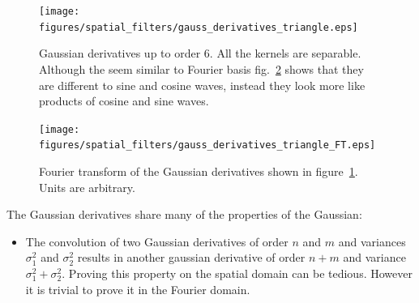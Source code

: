 \begin{figure}
\centerline{
\texttt{[image: figures/spatial\_filters/gauss\_derivatives\_triangle.eps]}}
\caption{Gaussian derivatives up to order 6. All the kernels are separable. Although the seem similar to Fourier basis fig.~\ref{fig:gauss_derivatives_triangle_FT} shows that they are different to sine and cosine waves, instead they look more like products of cosine and sine waves.} 
\label{fig:gauss_derivatives_triangle}
\end{figure}


\begin{figure}
\centerline{
\texttt{[image: figures/spatial\_filters/gauss\_derivatives\_triangle\_FT.eps]}}
\caption{Fourier transform of the Gaussian derivatives shown in figure~\ref{fig:gauss_derivatives_triangle}. Units are arbitrary.} 
\label{fig:gauss_derivatives_triangle_FT}
\end{figure}


The Gaussian derivatives share many of the properties of the Gaussian: 
\begin{itemize}
\item The convolution of two Gaussian derivatives of order $n$ and $m$ and variances $\sigma_1^2$ and $\sigma_2^2$ results in another gaussian derivative of order $n+m$ and variance $\sigma_1^2 + \sigma_2^2$. Proving this property on the spatial domain can be tedious. However it is trivial to prove it in the Fourier domain. 
\end{itemize}



